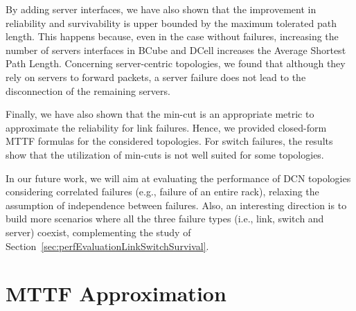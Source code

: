 By adding server interfaces, we have also shown that the improvement in reliability and survivability is upper bounded by the maximum tolerated path length. This happens because, even in the case without failures, increasing the number of servers interfaces in BCube and DCell increases the Average Shortest Path Length. Concerning server-centric topologies, we found that although they rely on servers to forward packets, a server failure does not lead to the disconnection of the remaining servers. 

Finally, we have also shown that the min-cut is an appropriate metric to approximate the reliability for link failures. Hence, we provided closed-form MTTF formulas for the considered topologies. For switch failures, the results show that the utilization of min-cuts is not well suited for some topologies.

In our future work, we will aim at evaluating the performance of DCN topologies considering correlated failures (e.g., failure of an entire rack), relaxing the assumption of independence between failures. Also, an interesting direction is to build more scenarios where all the three failure types (i.e., link, switch and server) coexist, complementing the study of Section~\ref{sec:perfEvaluationLinkSwitchSurvival}. 

\appendix

\section{MTTF Approximation}
\label{app:compMTTFapprox}

